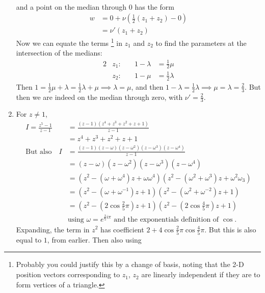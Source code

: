 \documentclass[fleqn,a4paper,11pt]{article}
\begin{document}
\begin{enumerate}
\begin{align*}
    \end{align*}
    and a point on the median through 0 has the form
    \begin{align*}
     w &= 0 + \nu (\tfrac 12 (z_1 + z_2) - 0) \\
       &= \nu' (z_1 + z_2)
    \end{align*}
    Now we can equate the terms
    \footnote{
     Probably you could justify this by a change of basis, noting that the 2-D
     position vectors corresponding to \(z_1\), \(z_2\) are linearly independent
     if they are to form vertices of a triangle.}
    in \(z_1\) and
    \(z_2\) to find the parameters at
    the intersection of the medians:
    \begin{alignat*}2
     &z_1\colon\quad& 1 - \lambda &= \tfrac 12 \mu \\
     &z_2\colon\quad& 1 - \mu &= \tfrac 12 \lambda
    \end{alignat*}
    Then
    \(1 = \frac 12 \mu + \lambda = \frac 12 \lambda + \mu \implies
      \lambda = \mu\), and then
    \(1 - \lambda = \frac 12 \lambda \implies
      \mu = \lambda = \frac 23\). But then we are indeed on the median through
    zero, with \(\nu' = \frac 23\).
   \item For \(z \ne 1\),
    \begin{align*}
     I = \frac{z^5 - 1}{z - 1}
       &= \frac{(z - 1)(z^4 + z^3 + z^2 + z + 1)}{z - 1} \\
       &= z^4 + z^3 + z^2 + z + 1 \\
     \text{But also}\quad
     I &= \frac{(z - 1)(z - \omega)
                (z - \omega^2)(z - \omega^3)(z - \omega^4)}{z - 1} \\
       &= (z - \omega)(z - \omega^2)(z - \omega^3)(z - \omega^4) \\
       &= (z^2 - (\omega + \omega^4)z + \omega \omega^4)
          (z^2 - (\omega^2 + \omega^3)z + \omega^2\omega_3) \\
       &= (z^2 - (\omega + \omega^{-1})z + 1)
          (z^2 - (\omega^2 + \omega^{-2})z + 1) \\
       &= (z^2 - (2 \cos \tfrac 25 \pi)z + 1)
          (z^2 - (2 \cos \tfrac 45 \pi)z + 1) \\
       &\text{using \(\omega = e^{\frac 25 i\pi}\) and the exponentials
              definition of \(\cos\).}
    \end{align*}
    Expanding, the term in \(z^2\) has coefficient
    \(2 + 4\cos \frac 25 \pi \cos \frac 45 \pi\). But this is also equal to
    \(1\), from earlier. Then also using

\end{enumerate}
\end{document}
